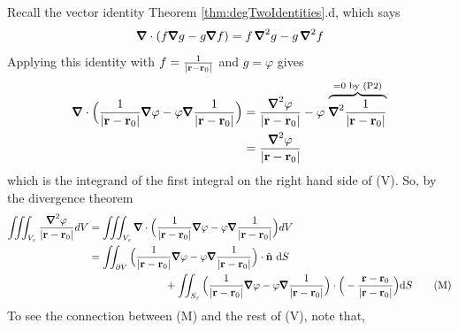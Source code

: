 Recall the vector identity Theorem \ref{thm:degTwoIdentities}.d, which says
\begin{equation*}
\vnabla\cdot(f\vnabla g-g\vnabla f)=f\,\vnabla^2g-g\,\vnabla^2f
\end{equation*}
Applying this identity with $f= \frac{1}{|\mathbf{r}-\mathbf{r}_0|}$ and $g=\varphi$
gives
\begin{align*}
\vnabla\cdot\Big(\frac{1}{|\vr-\vr_0|}\vnabla\varphi
-\varphi\vnabla\frac{1}{|\vr-\vr_0|}\Big)
&=\frac{\vnabla^2\varphi}{|\vr-\vr_0|}
  -\varphi\,\overbrace{ \vnabla^2\frac{1}{|\vr-\vr_0|} }^{=0\text{ by (P2)}} \\
&=\frac{\vnabla^2\varphi}{|\vr-\vr_0|}
\end{align*}
which is the integrand of the first integral on the right hand side of (V). 
So, by the divergence theorem
\begin{align}
\tripInt_{V_\veps} \frac{\vnabla^2\varphi}{|\vr-\vr_0|} dV
&=\tripInt_{V_\veps}\vnabla\cdot\Big(\frac{1}{|\vr-\vr_0|}\vnabla\varphi
-\varphi\vnabla\frac{1}{|\vr-\vr_0|}\Big) dV \notag\\
&=\dblInt_{\partial V}\Big(\frac{1}{|\vr-\vr_0|}\vnabla\varphi
-\varphi\vnabla\frac{1}{|\vr-\vr_0|}\Big)\cdot\hn\ \dee{S}  \notag\\
&\hskip1in+\dblInt_{S_\veps}\Big(\frac{1}{|\vr-\vr_0|}\vnabla\varphi
-\varphi\vnabla\frac{1}{|\vr-\vr_0|}\Big)\cdot
\Big(-\frac{\vr-\vr_0}{|\vr-\vr_0|}\Big) \dee{S}
\tag{M}\end{align}
To see the connection between (M) and the rest of (V), note that, 


